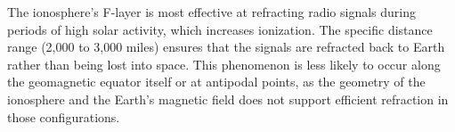 The ionosphere’s F-layer is most effective at refracting radio signals during periods of high solar activity, which increases ionization. The specific distance range (2,000 to 3,000 miles) ensures that the signals are refracted back to Earth rather than being lost into space. This phenomenon is less likely to occur along the geomagnetic equator itself or at antipodal points, as the geometry of the ionosphere and the Earth’s magnetic field does not support efficient refraction in those configurations.

